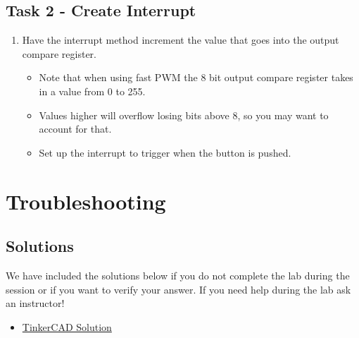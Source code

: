 \documentclass{article}
\begin{document}
    \subsection{Task 2 - Create Interrupt}
        \begin{enumerate}
            \item Have the interrupt method increment the value that goes into the output compare register.
            \begin{itemize}
                \item Note that when using fast PWM the 8 bit output compare register takes in a value from 0 to 255.
                \item Values higher will overflow losing bits above 8, so you may want to account for that.
                \item Set up the interrupt to trigger when the button is pushed.
            \end{itemize}
        \end{enumerate}
        
\section{Troubleshooting}
    \subsection{Solutions}
    We have included the solutions below if you do not complete the lab during the session or if you want to verify your answer. If you need help during the lab ask an instructor!
\begin{itemize}
    \item \href{https://www.tinkercad.com/things/juqsfPwatRF}{TinkerCAD Solution}
    \end{itemize}
\end{document}
